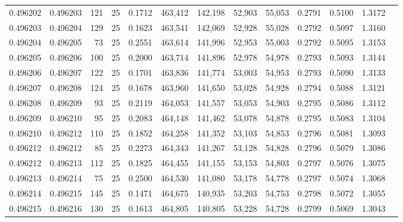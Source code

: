 \begin{tabular}{rrrrrrrrrrrrr}
0.496202 & 0.496203 &   121 &  25 &                                     0.1712 & 463,412 & 142,198 &  52,903 &  55,053 & 0.2791 & 0.5100 & 1.3172 \\
0.496203 & 0.496204 &   129 &  25 &                                     0.1623 & 463,541 & 142,069 &  52,928 &  55,028 & 0.2792 & 0.5097 & 1.3160 \\
0.496204 & 0.496205 &    73 &  25 &                                     0.2551 & 463,614 & 141,996 &  52,953 &  55,003 & 0.2792 & 0.5095 & 1.3153 \\
0.496205 & 0.496206 &   100 &  25 &                                     0.2000 & 463,714 & 141,896 &  52,978 &  54,978 & 0.2793 & 0.5093 & 1.3144 \\
0.496206 & 0.496207 &   122 &  25 &                                     0.1701 & 463,836 & 141,774 &  53,003 &  54,953 & 0.2793 & 0.5090 & 1.3133 \\
0.496207 & 0.496208 &   124 &  25 &                                     0.1678 & 463,960 & 141,650 &  53,028 &  54,928 & 0.2794 & 0.5088 & 1.3121 \\
0.496208 & 0.496209 &    93 &  25 &                                     0.2119 & 464,053 & 141,557 &  53,053 &  54,903 & 0.2795 & 0.5086 & 1.3112 \\
0.496209 & 0.496210 &    95 &  25 &                                     0.2083 & 464,148 & 141,462 &  53,078 &  54,878 & 0.2795 & 0.5083 & 1.3104 \\
0.496210 & 0.496212 &   110 &  25 &                                     0.1852 & 464,258 & 141,352 &  53,103 &  54,853 & 0.2796 & 0.5081 & 1.3093 \\
0.496212 & 0.496212 &    85 &  25 &                                     0.2273 & 464,343 & 141,267 &  53,128 &  54,828 & 0.2796 & 0.5079 & 1.3086 \\
0.496212 & 0.496213 &   112 &  25 &                                     0.1825 & 464,455 & 141,155 &  53,153 &  54,803 & 0.2797 & 0.5076 & 1.3075 \\
0.496213 & 0.496214 &    75 &  25 &                                     0.2500 & 464,530 & 141,080 &  53,178 &  54,778 & 0.2797 & 0.5074 & 1.3068 \\
0.496214 & 0.496215 &   145 &  25 &                                     0.1471 & 464,675 & 140,935 &  53,203 &  54,753 & 0.2798 & 0.5072 & 1.3055 \\
0.496215 & 0.496216 &   130 &  25 &                                     0.1613 & 464,805 & 140,805 &  53,228 &  54,728 & 0.2799 & 0.5069 & 1.3043 \\

\end{tabular}
